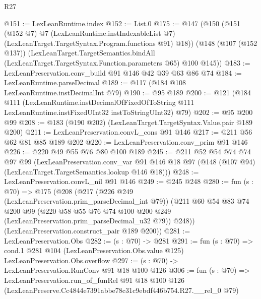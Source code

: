 \begin{lexlean}{R27}
\begin{coremodule}
@151 := LexLeanRuntime.index
@152 := List.{0}
@175 := @147
    (@150
      (@151
        (@152 @7)
        @7
        (LexLeanRuntime.instIndexableList @7)
        (LexLeanTarget.TargetSyntax.Program.functions @91)
        @18))
    (@148
      (@107 (@152 @137))
      (LexLeanTarget.TargetSemantics.bindAll
        (LexLeanTarget.TargetSyntax.Function.parameters @65)
        @100
        @145))
@183 := LexLeanPreservation.conv_build @91 @146 @42 @39 @63 @86 @74
@184 := LexLeanRuntime.parseDecimal
@189 := @117 (@184 @108 LexLeanRuntime.instDecimalInt @79)
@190 := @95 @189
@200 := @121
    (@184
      @111
      (LexLeanRuntime.instDecimalOfFixedOfToString
        @111
        LexLeanRuntime.instFixedUInt32
        instToStringUInt32)
      @79)
@202 := @95 @200 @99
@208 := @183 (@190 @202) (LexLeanTarget.TargetSyntax.Value.pair @189 @200)
@211 := LexLeanPreservation.convL_cons @91 @146
@217 := @211 @56 @62 @81 @85 @189 @202
@220 := LexLeanPreservation.conv_prim @91 @146
@226 := @220 @49 @55 @76 @80 @100 @189
@245 := @211
    @52
    @54
    @74
    @74
    @97
    @99
    (LexLeanPreservation.conv_var
      @91
      @146
      @18
      @97
      (@148 (@107 @94) (LexLeanTarget.TargetSemantics.lookup @146 @18)))
@248 := LexLeanPreservation.convL_nil @91 @146
@249 := @245 @248
@280 := fun (s : @70) =>
  @175
    (@208
      (@217
        (@226 @249 (LexLeanPreservation.prim_parseDecimal_int @79))
        (@211
          @60
          @54
          @83
          @74
          @200
          @99
          (@220 @58 @55 @76 @74 @100 @200 @249 (LexLeanPreservation.prim_parseDecimal_u32 @79))
          @248))
      (LexLeanPreservation.construct_pair @189 @200))
@281 := LexLeanPreservation.Obs
@282 := (s : @70) -> @281
@291 := fun (s : @70) =>
  cond.{1} @281 @104 (LexLeanPreservation.Obs.value @125) LexLeanPreservation.Obs.overflow
@297 := (s : @70) -> LexLeanPreservation.RunConv @91 @18 @100 @126
@306 := fun (s : @70) =>
  LexLeanPreservation.run_of_funRel
    @91
    @18
    @100
    @126
    (LexLeanPreserve.Cc4844e7391abbe78c31c9ebdf446b754.R27.__rel_0 @79)
\end{coremodule}
\end{lexlean}

